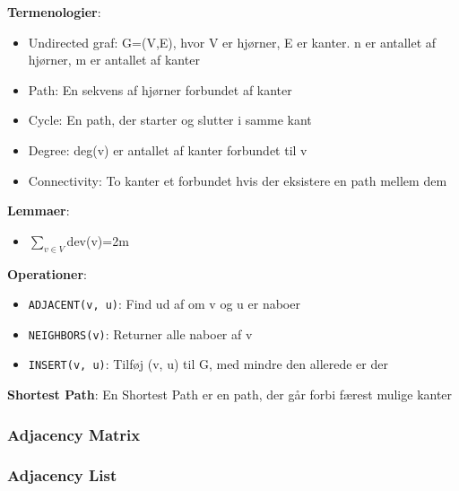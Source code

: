 \textbf{Termenologier}:
\begin{itemize}
	\item Undirected graf: G=(V,E), hvor V er hjørner, E er kanter. n er antallet af hjørner, m er antallet af kanter
	\item Path: En sekvens af hjørner forbundet af kanter
	\item Cycle: En path, der starter og slutter i samme kant
	\item Degree: deg(v) er antallet af kanter forbundet til v
	\item Connectivity: To kanter et forbundet hvis der eksistere en path mellem dem
\end{itemize}
\textbf{Lemmaer}:
\begin{itemize}
	\item $\sum_{v\in V}$dev(v)=2m
\end{itemize}
\textbf{Operationer}:
\begin{itemize}
	\item \texttt{ADJACENT(v, u)}: Find ud af om v og u er naboer
	\item \texttt{NEIGHBORS(v)}: Returner alle naboer af v
	\item \texttt{INSERT(v, u)}: Tilføj (v, u) til G, med mindre den allerede er der
\end{itemize}
\textbf{Shortest Path}: En Shortest Path er en path, der går forbi færest mulige kanter

\subsubsection{Adjacency Matrix}

\newpage

\subsubsection{Adjacency List}
